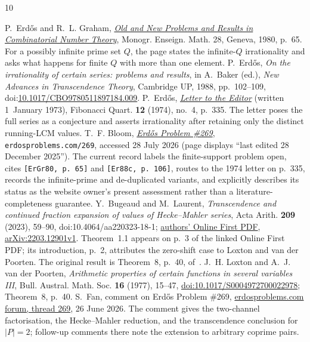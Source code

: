 \documentclass[11pt]{article}
\begin{document}
\begin{thebibliography}{10}
\small\raggedright
\setlength{\itemsep}{0pt}
 P.~Erd\H{o}s and R.~L. Graham,
  \href{https://mathweb.ucsd.edu/~ronspubs/80_11_number_theory.pdf}{\emph{Old
  and New Problems and Results in Combinatorial Number Theory}},
  Monogr. Enseign. Math. 28, Geneva, 1980, p.~65.  For a possibly infinite
  prime set $Q$, the page states the infinite-$Q$ irrationality and asks what
  happens for finite $Q$ with more than one element.
 P.~Erd\H{o}s, \emph{On the irrationality of certain series:
  problems and results}, in A.~Baker (ed.), \emph{New Advances in Transcendence
  Theory}, Cambridge UP, 1988, pp.~102--109,
  doi:\href{https://doi.org/10.1017/CBO9780511897184.009}{10.1017/CBO9780511897184.009}.
 P.~Erd\H{o}s,
  \href{https://www.fq.math.ca/Scanned/12-4/letter.pdf}{\emph{Letter to the
  Editor}} (written 1~January 1973), Fibonacci Quart. \textbf{12} (1974),
  no.~4, p.~335.  The letter poses the full series as a conjecture and asserts
  irrationality after retaining only the distinct running-LCM values.
 T.~F. Bloom,
  \href{https://www.erdosproblems.com/269}{\emph{Erd\H{o}s Problem \#269}},
  \texttt{erdosproblems.com/269}, accessed 28 July 2026 (page displays
  ``last edited 28 December 2025'').  The current record labels the
  finite-support problem open, cites \texttt{[ErGr80, p.~65]} and
  \texttt{[Er88c, p.~106]}, routes to the 1974 letter on p.~335, records the
  infinite-prime and de-duplicated variants, and explicitly describes its
  status as the website owner's present assessment rather than a
  literature-completeness guarantee.
 Y.~Bugeaud and M.~Laurent,
  \emph{Transcendence and continued fraction expansion of values of
  Hecke--Mahler series}, Acta Arith. \textbf{209} (2023), 59--90,
  doi:10.4064/aa220323-18-1;
  \href{https://irma.math.unistra.fr/~bugeaud/travaux/BuMLAA.pdf}
  {authors' Online First PDF},
  \href{https://arxiv.org/abs/2203.12901}{arXiv:2203.12901v1}.
  Theorem~1.1 appears on p.~3 of the linked Online First PDF; its
  introduction, p.~2, attributes the zero-shift case to Loxton and van der
  Poorten. The original result is Theorem~8, p.~40, of~\cite{loxtonvdp1977}.
 J.~H. Loxton and A.~J. van der Poorten,
  \emph{Arithmetic properties of certain functions in several variables III},
  Bull. Austral. Math. Soc. \textbf{16} (1977), 15--47,
  \href{https://doi.org/10.1017/S0004972700022978}{doi:10.1017/S0004972700022978};
  Theorem~8, p.~40.
 S.~Fan, comment on Erd\H{o}s Problem \#269,
  \href{https://www.erdosproblems.com/forum/thread/269}
  {erdosproblems.com forum, thread 269}, 26 June 2026.  The comment gives the
  two-channel factorisation, the Hecke--Mahler reduction, and the
  transcendence conclusion for $|P|=2$; follow-up comments there note the
  extension to arbitrary coprime pairs.
\end{thebibliography}
\end{document}
